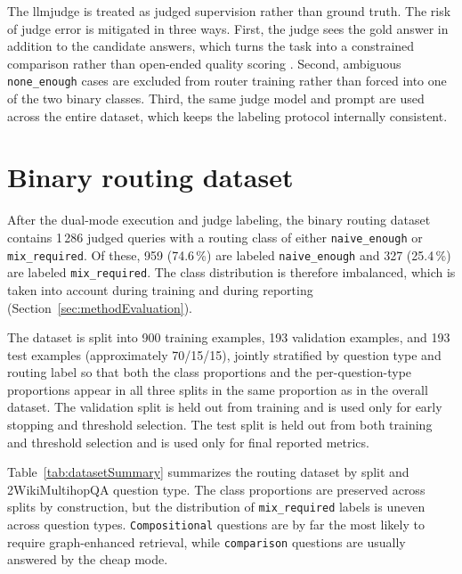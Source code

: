 \documentclass[english, bibtex]{kththesis}               %
\numberwithin{listing}{chapter}
\begin{document}
The \gls{llmjudge} is treated as judged supervision rather than ground truth. The risk of judge error is mitigated in three ways. First, the judge sees the gold answer in addition to the candidate answers, which turns the task into a constrained comparison rather than open-ended quality scoring \cite{zheng2023judge}. Second, ambiguous \texttt{none\_enough} cases are excluded from router training rather than forced into one of the two binary classes. Third, the same judge model and prompt are used across the entire dataset, which keeps the labeling protocol internally consistent.

\section{Binary routing dataset}
\label{sec:methodDataset}

After the dual-mode execution and judge labeling, the binary routing dataset contains 1\,286 judged queries with a routing class of either \texttt{naive\_enough} or \texttt{mix\_required}. Of these, 959 (74.6\,\%) are labeled \texttt{naive\_enough} and 327 (25.4\,\%) are labeled \texttt{mix\_required}. The class distribution is therefore imbalanced, which is taken into account during training and during reporting (Section~\ref{sec:methodEvaluation}).

The dataset is split into 900 training examples, 193 validation examples, and 193 test examples (approximately 70/15/15), jointly stratified by question type and routing label so that both the class proportions and the per-question-type proportions appear in all three splits in the same proportion as in the overall dataset. The validation split is held out from training and is used only for early stopping and threshold selection. The test split is held out from both training and threshold selection and is used only for final reported metrics.

Table~\ref{tab:datasetSummary} summarizes the routing dataset by split and 2WikiMultihopQA question type. The class proportions are preserved across splits by construction, but the distribution of \texttt{mix\_required} labels is uneven across question types. \texttt{Compositional} questions are by far the most likely to require graph-enhanced retrieval, while \texttt{comparison} questions are usually answered by the cheap mode.
\end{document}
